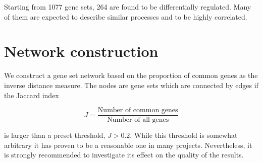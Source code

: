 \documentclass[9pt,a4paper,]{extarticle}
\newenvironment{Shaded}{\begin{snugshade}}{\end{snugshade}}
\newcommand{\KeywordTok}[1]{\textcolor[rgb]{0.13,0.29,0.53}{\textbf{#1}}}
\newcommand{\DataTypeTok}[1]{\textcolor[rgb]{0.13,0.29,0.53}{#1}}
\newcommand{\DecValTok}[1]{\textcolor[rgb]{0.00,0.00,0.81}{#1}}
\newcommand{\CharTok}[1]{\textcolor[rgb]{0.31,0.60,0.02}{#1}}
\newcommand{\StringTok}[1]{\textcolor[rgb]{0.31,0.60,0.02}{#1}}
\newcommand{\ControlFlowTok}[1]{\textcolor[rgb]{0.13,0.29,0.53}{\textbf{#1}}}
\newcommand{\OperatorTok}[1]{\textcolor[rgb]{0.81,0.36,0.00}{\textbf{#1}}}
\newcommand{\NormalTok}[1]{#1}
\begin{document}
\begin{Shaded}
\end{Shaded}

Starting from 1077 gene sets, 264 are found to be differentially regulated. Many of them are expected to describe similar processes and to be highly correlated.

\section{Network construction}\label{network-construction}

We construct a gene set network based on the proportion of common genes as the inverse distance measure. The nodes are gene sets which are connected by edges if the Jaccard index

\[ J = \frac{\text{Number of common genes}}{\text{Number of all genes}} \]

is larger than a preset threshold, \(J > 0.2\). While this threshold is somewhat arbitrary it has proven to be a reasonable one in many projects. Nevertheless, it is strongly recommended to investigate its effect on the quality of the results.
\end{document}
